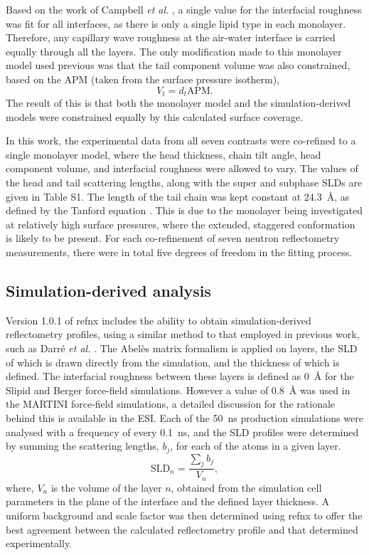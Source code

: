 \documentclass[amsmath,amssymb,twocolumn,superscriptaddress,aps,prl]{revtex4-1}
\begin{document}
%
Based on the work of Campbell \emph{et al.} \cite{Campbell2018}, a single value for the interfacial roughness was fit for all interfaces, as there is only a single lipid type in each monolayer.
Therefore, any capillary wave roughness at the air-water interface is carried equally through all the layers.
The only modification made to this monolayer model used previous was that the tail component volume was also constrained, based on the APM (taken from the surface pressure isotherm),
%
\begin{equation}
  V_t = d_t \text{APM}.
\end{equation}
%
The result of this is that both the monolayer model and the simulation-derived models were constrained equally by this calculated surface coverage.

In this work, the experimental data from all seven contrasts were co-refined to a single monolayer model, where the head thickness, chain tilt angle, head component volume, and interfacial roughness were allowed to vary.
The values of the head and tail scattering lengths, along with the super and subphase SLDs are given in Table S1.
The length of the tail chain was kept constant at \SI{24.3}{\angstrom}, as defined by the Tanford equation \cite{Tanford1980}.
This is due to the monolayer being investigated at relatively high surface pressures, where the extended, staggered conformation is likely to be present.
For each co-refinement of seven neutron reflectometry measurements, there were in total five degrees of freedom in the fitting process.

\subsection{Simulation-derived analysis}
Version 1.0.1 of refnx \cite{Nelson2018,refnx} includes the ability to obtain simulation-derived reflectometry profiles, using a similar method to that employed in previous work, such as Darr\'{e} \emph{et al.} \cite{Darre2015}.
The Abel\`{e}s matrix formalism is applied on layers, the SLD of which is drawn directly from the simulation, and the thickness of which is defined.
The interfacial roughness between these layers is defined as \SI{0}{\angstrom} for the Slipid and Berger force-field simulations.
However a value of \SI{0.8}{\angstrom} was used in the MARTINI force-field simulations, a detailed discussion for the rationale behind this is available in the ESI.
Each of the \SI{50}{\nano\second} production simulations were analysed with a frequency of every \SI{0.1}{\nano\second}, and the SLD profiles were determined by summing the scattering lengths, $b_j$, for each of the atoms in a given layer.
%
\begin{equation}
  \text{SLD}_n = \frac{\sum_j{b_j}}{V_n},
\end{equation}
%
where, $V_n$ is the volume of the layer $n$, obtained from the simulation cell parameters in the plane of the interface and the defined layer thickness.
A uniform background and scale factor was then determined using refnx to offer the best agreement between the calculated reflectometry profile and that determined experimentally.
\end{document}
